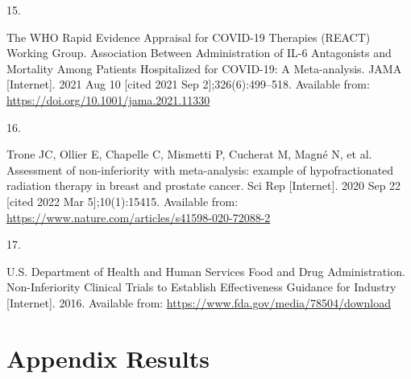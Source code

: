 \documentclass[
  12pt,
]{article}
\newlength{\cslhangindent}
\newlength{\csllabelwidth}
\newlength{\cslentryspacingunit} %
\newenvironment{CSLReferences}[2] %
 {%
  \setlength{\parindent}{0pt}
  \ifodd #1
  \let\oldpar\par
  \def\par{\hangindent=\cslhangindent\oldpar}
  \fi
  \setlength{\parskip}{#2\cslentryspacingunit}
 }%
 {}
\newcommand{\CSLLeftMargin}[1]{\parbox[t]{\csllabelwidth}{#1}}
\newcommand{\CSLRightInline}[1]{\parbox[t]{\linewidth - \csllabelwidth}{#1}\break}
\begin{document}
\begin{CSLReferences}{0}{0}
\leavevmode{}%
\CSLLeftMargin{15. }
\CSLRightInline{The WHO Rapid Evidence Appraisal for COVID-19 Therapies
(REACT) Working Group. Association Between Administration of IL-6
Antagonists and Mortality Among Patients Hospitalized for COVID-19: A
Meta-analysis. JAMA {[}Internet{]}. 2021 Aug 10 {[}cited 2021 Sep
2{]};326(6):499--518. Available from:
\url{https://doi.org/10.1001/jama.2021.11330}}

\leavevmode{}%
\CSLLeftMargin{16. }
\CSLRightInline{Trone JC, Ollier E, Chapelle C, Mismetti P, Cucherat M,
Magné N, et al. Assessment of non-inferiority with meta-analysis:
example of hypofractionated radiation therapy in breast and prostate
cancer. Sci Rep {[}Internet{]}. 2020 Sep 22 {[}cited 2022 Mar
5{]};10(1):15415. Available from:
\url{https://www.nature.com/articles/s41598-020-72088-2}}

\leavevmode{}%
\CSLLeftMargin{17. }
\CSLRightInline{U.S. Department of Health and Human Services Food and
Drug Administration. Non-Inferiority Clinical Trials to Establish
Effectiveness Guidance for Industry {[}Internet{]}. 2016. Available
from: \url{https://www.fda.gov/media/78504/download}}

\end{CSLReferences}

\newpage

\hypertarget{appendix-results}{%
\section{Appendix Results}\label{appendix-results}}

\end{document}
